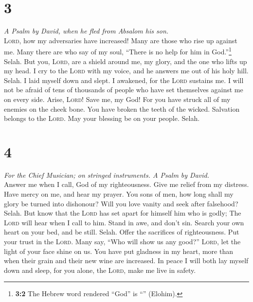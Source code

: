 \hypertarget{section-2}{%
\section{3}\label{section-2}}

\emph{A Psalm by David, when he fled from Absalom his son.}\\
 \textsc{Lord}, how my adversaries have increased! Many
are those who rise up against me.  Many there are who say
of my soul, ``There is no help for him in God.''\footnote{\textbf{3:2}
  The Hebrew word rendered ``God'' is ``'' (Elohim).}
Selah.  But you, \textsc{Lord}, are a shield around me, my
glory, and the one who lifts up my head.  I cry to the
\textsc{Lord} with my voice, and he answers me out of his holy hill.
Selah.  I laid myself down and slept. I awakened, for the
\textsc{Lord} sustains me.  I will not be afraid of tens
of thousands of people who have set themselves against me on every side.
 Arise, \textsc{Lord}! Save me, my God! For you have
struck all of my enemies on the cheek bone. You have broken the teeth of
the wicked.  Salvation belongs to the \textsc{Lord}. May
your blessing be on your people. Selah.

\hypertarget{section-3}{%
\section{4}\label{section-3}}

\emph{For the Chief Musician; on stringed instruments. A Psalm by
David.}\\
 Answer me when I call, God of my righteousness. Give me
relief from my distress. Have mercy on me, and hear my prayer.
 You sons of men, how long shall my glory be turned into
dishonour? Will you love vanity and seek after falsehood? Selah.
 But know that the \textsc{Lord} has set apart for himself
him who is godly; The \textsc{Lord} will hear when I call to him.
 Stand in awe, and don't sin. Search your own heart on
your bed, and be still. Selah.  Offer the sacrifices of
righteousness. Put your trust in the \textsc{Lord}.  Many
say, ``Who will show us any good?'' \textsc{Lord}, let the light of your
face shine on us.  You have put gladness in my heart, more
than when their grain and their new wine are increased. 
In peace I will both lay myself down and sleep, for you alone, the
\textsc{Lord}, make me live in safety.

